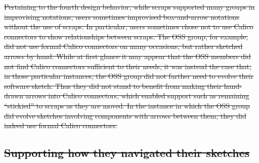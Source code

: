 \documentclass[12pt,fleqn]{ucithesis}
\providecommand{\DIFdeltex}[1]{{\protect\color{red}\sout{#1}}}                      %
\providecommand{\DIFdel}[1]{\texorpdfstring{\DIFdeltex{#1}}{}} %
\begin{document}
\DIFdel{Pertaining to the fourth design behavior, while scraps supported many groups in improvising notations, users sometimes improvised box-and-arrow notations without the use of scraps. In particular, users sometimes chose not to use Calico connectors to show relationships between scraps. The OSS group, for example, did not use formal Calico connectors on many occasions, but rather sketched arrows by hand. While at first glance it may appear that the OSS members did not find Calico connectors sufficient to their needs, it was instead the case that, in those particular instances, the OSS group did not further need to evolve their software sketch. Thus they did not stand to benefit from making their hand-drawn arrows into Calico connectors, which enabled support such as remaining ``stickied'' to scraps as they are moved. In the instance in which the OSS group did evolve sketches involving components with arrows between them, they did indeed use formal Calico connectors. 
}%



\subsection{\DIFdel{Supporting how they navigated their sketches}}
\addtocounter{subsection}{-1}%
\end{document}
